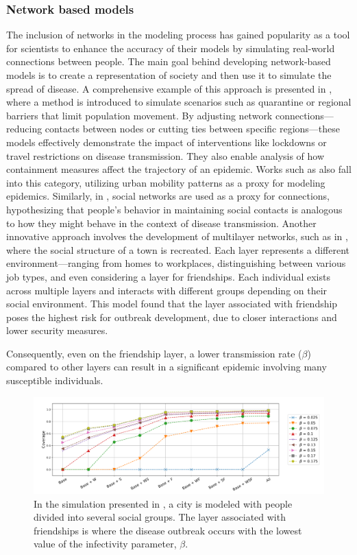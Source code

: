 \subsubsection{Network based models}
The inclusion of networks in the modeling process has gained popularity as a tool for scientists to enhance the accuracy of their models by simulating real-world connections between people. The main goal behind developing network-based models is to create a representation of society and then use it to simulate the spread of disease. A comprehensive example of this approach is presented in \cite{VanMieghem2009}, where a method is introduced to simulate scenarios such as quarantine or regional barriers that limit population movement. By adjusting network connections—reducing contacts between nodes or cutting ties between specific regions—these models effectively demonstrate the impact of interventions like lockdowns or travel restrictions on disease transmission. They also enable analysis of how containment measures affect the trajectory of an epidemic.
Works such as \cite{Tizzoni2014} also fall into this category, utilizing urban mobility patterns as a proxy for modeling epidemics. Similarly, in \cite{Carballosa_2021}, social networks are used as a proxy for connections, hypothesizing that people's behavior in maintaining social contacts is analogous to how they might behave in the context of disease transmission.
Another innovative approach involves the development of multilayer networks, such as in \cite{Turker_2023}, where the social structure of a town is recreated. Each layer represents a different environment—ranging from homes to workplaces, distinguishing between various job types, and even considering a layer for friendships. Each individual exists across multiple layers and interacts with different groups depending on their social environment. This model found that the layer associated with friendship poses the highest risk for outbreak development, due to closer interactions and lower security measures. 

Consequently, even on the friendship layer, a lower transmission rate ($\beta$) compared to other layers can result in a significant epidemic involving many susceptible individuals.
\begin{figure}[ht]
	\centering
	\includegraphics[width=0.9\linewidth]{0_introduction/images_review/turker_city_recreated}
	\caption[Simulation of disease spreading within a city]{In the simulation presented in \cite{Turker_2023}, a city is modeled with people divided into several social groups. The layer associated with friendships is where the disease outbreak occurs with the lowest value of the infectivity parameter, $\beta$.}
	\label{fig:turkercityrecreated}
\end{figure}
